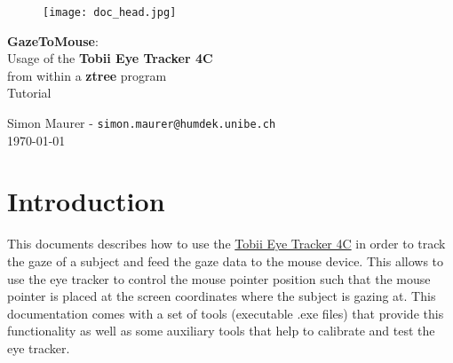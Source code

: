 \documentclass[a4paper,oneside]{book}
\begin{document}
\begin{figure}[h]
  \texttt{[image: doc\_head.jpg]}
\end{figure}

\parindent=0pt
\parskip=0.25cm

\begin{center}
\fontsize{20}{21}\selectfont

\textbf{GazeToMouse}:\\
Usage of the \textbf{Tobii Eye Tracker 4C}\\
from within a \textbf{ztree} program\\
\vskip 6mm
Tutorial
\vskip 6mm

\fontsize{13}{14}\selectfont
Simon Maurer - \texttt{simon.maurer@humdek.unibe.ch}\\
\today
\end{center}

\tableofcontents

\chapter{Introduction}\label{sec.intro}
This documents describes how to use the \href{https://tobiigaming.com/eye-tracker-4c/}{Tobii Eye Tracker 4C} in order to track the gaze of a subject and feed the gaze data to the mouse device.
This allows to use the eye tracker to control the mouse pointer position such that the mouse pointer is placed at the screen coordinates where the subject is gazing at.
This documentation comes with a set of tools (executable .exe files) that provide this functionality as well as some auxiliary tools that help to calibrate and test the eye tracker.
\end{document}
